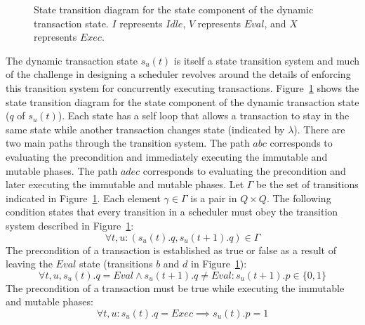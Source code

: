 \begin{figure}
\centering
\begingroup
\fontsize{10pt}{12pt}\selectfont
{}
\endgroup
\caption[Transition diagram for the state component of the dynamic transaction state]{State transition diagram for the state component of the dynamic transaction state.
  $I$ represents $\mathit{Idle}$, $V$ represents $\mathit{Eval}$, and $X$ represents $\mathit{Exec}$.
  \label{dt_state}}
\end{figure}

The dynamic transaction state $s_u(t)$ is itself a state transition system and much of the challenge in designing a scheduler revolves around the details of enforcing this transition system for concurrently executing transactions.
Figure~\ref{dt_state} shows the state transition diagram for the state component of the dynamic transaction state ($q$ of $s_u(t)$).
Each state has a self loop that allows a transaction to stay in the same state while another transaction changes state (indicated by $\lambda$).
There are two main paths through the transition system.
The path $abc$ corresponds to evaluating the precondition and immediately executing the immutable and mutable phases.
The path $adec$ corresponds to evaluating the precondition and later executing the immutable and mutable phases.
Let $\Gamma$ be the set of transitions indicated in Figure~\ref{dt_state}.
Each element $\gamma \in \Gamma$ is a pair in $Q \times Q$.
The following condition states that every transition in a scheduler must obey the transition system described in Figure~\ref{dt_state}:
\begin{equation}
  \forall t, u : (s_u(t).q, s_u(t+1).q) \in \Gamma
\end{equation}
The precondition of a transaction is established as true or false as a result of leaving the $\mathit{Eval}$ state (transitions $b$ and $d$ in Figure~\ref{dt_state}):
\begin{equation}
  \label{pre_establish}
  \forall t, u, s_u(t).q = \mathit{Eval} \land s_u(t+1).q \neq \mathit{Eval} : s_u(t+1).p \in \{0,1\}
\end{equation}
The precondition of a transaction must be true while executing the immutable and mutable phases:
\begin{equation}
  \label{pre_true}
  \forall t, u : s_u(t).q = \mathit{Exec} \implies s_u(t).p = 1
\end{equation}


